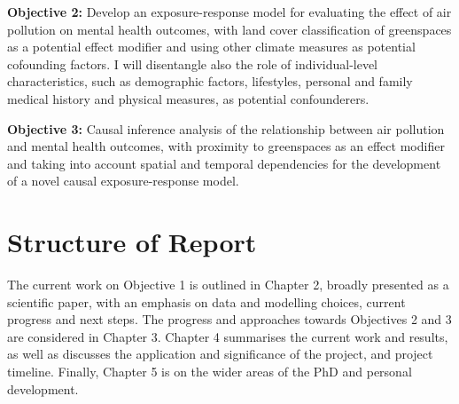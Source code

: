 \textbf{Objective 2:} Develop an exposure-response model for evaluating the effect of air pollution on mental health outcomes, with land cover classification of greenspaces as a potential effect modifier and using other climate measures as potential cofounding factors. I will disentangle also the role of individual-level characteristics, such as demographic factors, lifestyles, personal and family medical history and physical measures, as potential confounderers.  

\textbf{Objective 3:} Causal inference analysis of the relationship between air pollution and mental health outcomes, with proximity to greenspaces as an effect modifier and taking into account spatial and temporal dependencies for the development of a novel causal exposure-response model.

\section{Structure of Report}


The current work on Objective 1 is outlined in Chapter 2, broadly presented as a scientific paper, with an emphasis on data and modelling choices, current progress and next steps. The progress and approaches towards Objectives 2 and 3 are considered in Chapter 3. Chapter 4 summarises the current work and results, as well as discusses the application and significance of the project, and project timeline. Finally, Chapter 5 is on the wider areas of the PhD and personal development.